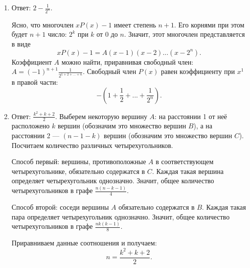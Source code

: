\documentclass[11pt, a4paper]{article}
\begin{document}
\begin{enumerate}
\item Ответ: $2 - \frac{1}{2^n}$.

Ясно, что многочлен $x P(x) - 1$ имеет степень $n+1$. Его корнями при этом будет $n+1$ число: $2^k$ при $k$ от $0$ до $n$. Значит, этот многочлен представляется в виде 
$$x P(x) - 1 = A (x - 1) (x - 2) ... (x - 2^n).$$
Коэффициент $A$ можно найти, приравнивая свободный член: $A = (-1)^{n+1} \frac{1}{2^{1+2+...+n}}$. Свободный член $P(x)$ равен коэффициенту при $x^1$ в правой части:
$$ - \left(1 + \frac{1}{2} + ... + \frac{1}{2^n} \right).$$

\item Ответ: $\frac{k^2 + k + 2}{2}$. Выберем некоторую вершину $A$: на расстоянии 1 от неё расположено $k$ вершин (обозначим это множество вершин $B$), а на расстоянии 2 ---  $(n - 1 - k)$ вершин (обозначим это множество вершин $C$). Посчитаем количество различных четырехугольников. 

Способ первый: вершины, противоположные $A$ в соответствующем четырехугольнике, обязательно содержатся в $C$. Каждая такая вершина определяет четырехугольник однозначно. Значит, общее количество четырехугольников в графе $\frac{n(n-k-1)}{4}$.

Способ второй: соседи вершины $A$ обязательно содержатся в $B$. Каждая такая пара определяет четырехугольник однозначно. Значит, общее количество четырехугольников в графе $\frac{nk(k-1)}{8}$.

Приравниваем данные соотношения и получаем:
$$n = \frac{k^2 + k + 2}{2}.$$

\end{enumerate}
\end{document}
